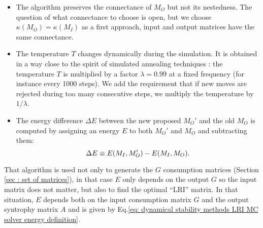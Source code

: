 \documentclass[12pt, titlepage]{report}
\begin{document}
\begin{itemize}
\item The algorithm preserves the connectance of $M_O$ but not its nestedness. The question of what connectance to choose is open, but we choose $\kappa(M_O)=\kappa(M_I)$ as a first approach, \ie input and output matrices have the same connectance.
\item The temperature $T$ changes dynamically during the simulation. It is obtained in a way close to the spirit of simulated annealing techniques \cite{gendreau_simulated_2019}: the temperature $T$ is multiplied by a factor $\lambda=0.99$ at a fixed frequency (for instance every 1000 steps). We add the requirement that if new moves are rejected during too many consecutive steps, we multiply the temperature by $1/\lambda$.
\item The energy difference $\Delta E$ between the new proposed $M_O'$ and the old $M_O$ is computed by assigning an energy $E$ to both $M_O'$ and $M_O$ and subtracting them:
\begin{equation}
\Delta E \equiv E(M_I, M_O')-E(M_I, M_O).
\end{equation}
\end{itemize}
That algorithm is used not only to generate the $G$ consumption matrices (Section \ref{sec : set of matrices}), in that case $E$ only depends on the output $G$ so the input matrix does not matter, but also to find the optimal ``LRI'' matrix. In that situation, $E$ depends both on the input consumption matrix $G$ and the output syntrophy matrix $A$ and is given by Eq.\eqref{eq: dynamical stability methods LRI MC solver energy definition}.
\end{document}
